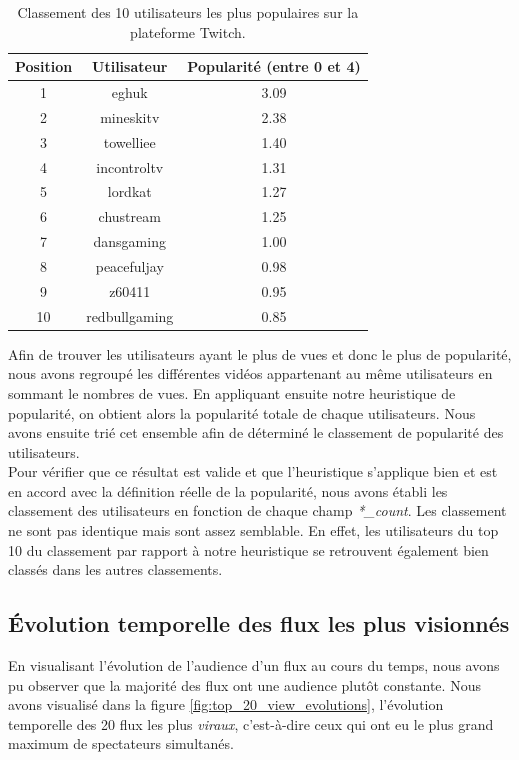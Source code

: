 \documentclass[11pt, a4paper, titlepage]{scrartcl}
\begin{document}
\begin{table}[h]
  \centering
   \caption{\label{tab:user_rank} Classement des 10 utilisateurs les plus populaires
   sur la plateforme Twitch.}
   \begin{tabular}{|c|c|c|}
     \hline
     Position & Utilisateur & Popularité (entre 0 et 4) \\
     \hline
      1 & eghuk & 3.09 \\
      2 & mineskitv & 2.38 \\
      3 & towelliee & 1.40 \\
      4 & incontroltv & 1.31 \\
      5 & lordkat & 1.27 \\
      6 & chustream & 1.25 \\
      7 & dansgaming & 1.00 \\
      8 & peacefuljay & 0.98 \\
      9 & z60411 & 0.95 \\
      10 & redbullgaming & 0.85 \\
     \hline
  \end{tabular}
\end{table}

Afin de trouver les utilisateurs ayant le plus de vues et donc le plus de
popularité, nous avons regroupé les différentes vidéos appartenant au même
utilisateurs en sommant le nombres de vues. En appliquant ensuite notre
heuristique de popularité, on obtient alors la popularité totale de chaque
utilisateurs. Nous avons ensuite trié cet ensemble afin de déterminé le
classement de popularité des utilisateurs. \\

Pour vérifier que ce résultat est valide et que l'heuristique s'applique bien
et est en accord avec la définition réelle de la popularité, nous avons établi
les classement des utilisateurs en fonction de chaque champ \textit{*\_count}.
Les classement ne sont pas identique mais sont assez semblable. En effet, les
utilisateurs du top 10 du classement par rapport à notre heuristique se
retrouvent également bien classés dans les autres classements. \\

\subsection{Évolution temporelle des flux les plus visionnés}

En visualisant l'évolution de l'audience d'un flux au cours du temps, nous
avons pu observer que la majorité des flux ont une audience plutôt constante.
Nous avons visualisé dans la figure \ref{fig:top_20_view_evolutions}, l'évolution
temporelle des 20 flux les plus \textit{viraux}, c'est-à-dire ceux qui ont eu
le plus grand maximum de spectateurs simultanés. \\
\end{document}
